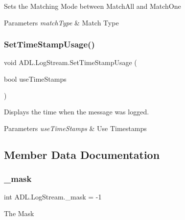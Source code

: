 Sets the Matching Mode between Match\+All and Match\+One 


\begin{DoxyParams}{Parameters}
{\em match\+Type} & Match Type\\
\hline
\end{DoxyParams}
\mbox{\label{class_a_d_l_1_1_log_stream_a533f3bae752ab3ee1c3f1aaac23a7d05}} 
\subsubsection{\texorpdfstring{Set\+Time\+Stamp\+Usage()}{SetTimeStampUsage()}}
{\footnotesize\ttfamily void A\+D\+L.\+Log\+Stream.\+Set\+Time\+Stamp\+Usage (\begin{DoxyParamCaption}\item[{bool}]{use\+Time\+Stamps }\end{DoxyParamCaption})}



Displays the time when the message was logged. 


\begin{DoxyParams}{Parameters}
{\em use\+Time\+Stamps} & Use Timestamps\\
\hline
\end{DoxyParams}


\subsection{Member Data Documentation}
\mbox{\label{class_a_d_l_1_1_log_stream_a3d8bed5f5dbdebc350a831ea9eca999d}} 
\subsubsection{\texorpdfstring{\+\_\+mask}{\_mask}}
{\footnotesize\ttfamily int A\+D\+L.\+Log\+Stream.\+\_\+mask = -\/1\hspace{0.3cm}{\ttfamily [private]}}



The Mask 

